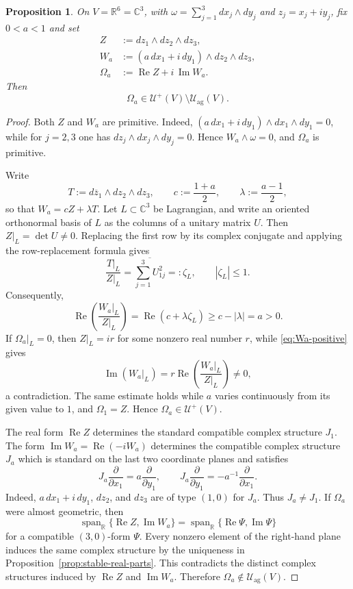 \documentclass[10pt,a4paper]{amsart}
\newtheorem{proposition}{Proposition}
\newcommand{\C}{\mathbb C}
\newcommand{\R}{\mathbb R}
\newcommand{\Span}{\operatorname{span}}
\newcommand{\U}{\mathcal U}
\newcommand{\Uag}{\mathcal U_{\mathrm{ag}}}
\begin{document}
\begin{proposition}\label{prop:explicit-nonag}
On $V=\R^6=\C^3$, with
$\omega=\sum_{j=1}^3dx_j\wedge dy_j$ and $z_j=x_j+iy_j$, fix
$0<a<1$ and set
\begin{align*}
 Z&:=dz_1\wedge dz_2\wedge dz_3,\\
 W_a&:=(a\,dx_1+i\,dy_1)\wedge dz_2\wedge dz_3,\\
 \Omega_a&:=\operatorname{Re}Z+i\,\operatorname{Im}W_a.
\end{align*}
Then
\[
 \Omega_a\in\U^+(V)\setminus\Uag(V).
\]
\end{proposition}

\begin{proof}
Both $Z$ and $W_a$ are primitive.  Indeed,
$(a\,dx_1+i\,dy_1)\wedge dx_1\wedge dy_1=0$, while for $j=2,3$ one has
$dz_j\wedge dx_j\wedge dy_j=0$.  Hence $W_a\wedge\omega=0$, and
$\Omega_a$ is primitive.

Write
\[
 T:=d\overline z_1\wedge dz_2\wedge dz_3,
 \qquad
 c:=\frac{1+a}{2},\qquad
 \lambda:=\frac{a-1}{2},
\]
so that $W_a=cZ+\lambda T$.  Let $L\subset\C^3$ be Lagrangian, and write
an oriented orthonormal basis of $L$ as the columns of a unitary matrix
$U$.  Then $Z|_L=\det U\neq0$.  Replacing the first row by its complex
conjugate and applying the row-replacement formula gives
\[
 \frac{T|_L}{Z|_L}
 =\overline{\sum_{j=1}^3U_{1j}^2}=: \zeta_L,
 \qquad |\zeta_L|\leq1.
\]
Consequently,
\begin{equation}\label{eq:Wa-positive}
 \operatorname{Re}\left(\frac{W_a|_L}{Z|_L}\right)
 =\operatorname{Re}(c+\lambda\zeta_L)
 \geq c-|\lambda|=a>0.
\end{equation}
If $\Omega_a|_L=0$, then $Z|_L=ir$ for some nonzero real number $r$, while
\eqref{eq:Wa-positive} gives
\[
 \operatorname{Im}(W_a|_L)
 =r\operatorname{Re}\left(\frac{W_a|_L}{Z|_L}\right)\neq0,
\]
a contradiction.  The same estimate holds while $a$ varies continuously
from its given value to $1$, and $\Omega_1=Z$.  Hence
$\Omega_a\in\U^+(V)$.

The real form $\operatorname{Re}Z$ determines the standard compatible
complex structure $J_1$.  The form
$\operatorname{Im}W_a=\operatorname{Re}(-iW_a)$ determines the compatible
complex structure $J_a$ which is standard on the last two coordinate
planes and satisfies
\[
 J_a\frac{\partial}{\partial x_1}
 =a\frac{\partial}{\partial y_1},
 \qquad
 J_a\frac{\partial}{\partial y_1}
 =-a^{-1}\frac{\partial}{\partial x_1}.
\]
Indeed, $a\,dx_1+i\,dy_1$, $dz_2$, and $dz_3$ are of type $(1,0)$ for
$J_a$.  Thus $J_a\neq J_1$.  If $\Omega_a$ were almost geometric, then
\[
 \Span_{\R}\{\operatorname{Re}Z,\operatorname{Im}W_a\}
 =\Span_{\R}\{\operatorname{Re}\Psi,\operatorname{Im}\Psi\}
\]
for a compatible $(3,0)$-form $\Psi$.  Every nonzero element of the
right-hand plane induces the same complex structure by the uniqueness in
Proposition~\ref{prop:stable-real-parts}.  This contradicts the distinct
complex structures induced by $\operatorname{Re}Z$ and
$\operatorname{Im}W_a$.  Therefore $\Omega_a\notin\Uag(V)$.
\end{proof}
\end{document}
